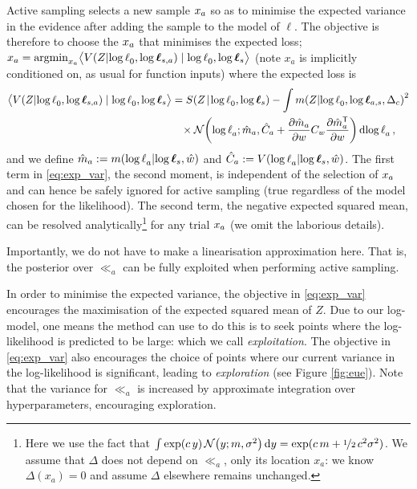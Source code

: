 \documentclass{article} %
\begin{document}
Active sampling selects a new sample $\lfv_a$ so as to minimise the expected variance in the evidence after adding the sample to the model of $\ell$.  The objective is therefore to choose the $\lfv_a$ that minimises the expected loss;
$\lfv_a = \argmin_{\lfv_a} \bigl\langle \cov{\If}{\ll_0,\tvr_{s,a}}\mid \ll_0,\tvr_{s}\bigr\rangle 
$
(note $x_a$ is implicitly conditioned on, as usual for function inputs) where the expected loss is
\begin{align}
\bigl\langle \cov{\If}{\ll_0,\tvr_{s,a}}\mid \ll_0,\tvr_{s}\bigr\rangle 
 & = \secm{\If}{\ll_0,\tvr_s} 
 - \int\mean{\If}{\ll_0,\tvr_{a,s},\Delta_c}^2\nonumber\\
& \hspace{0.3cm}
\times\N{\ll_a}
{\hat{m}_a }
{\hat{C}_a +\pderiv{\hat{m}_a}{w}C_w\pderiv{\hat{m}\tra_a}{w}}
\ud\ll_a\,,\label{eq:exp_var}
\end{align}
and we define
$\hat{m}_a \deq \mean{\ll_a}{\tvr_s,\hat{w}}$
and
$\hat{C}_a \deq \cov{\ll_a}{\tvr_s,\hat{w}}$.
The first term in \eqref{eq:exp_var}, the second moment, is independent of the selection of $\lfv_a$ and can hence  be safely ignored for active sampling (true regardless of the model chosen for the likelihood). 
The second term, the negative expected squared mean, can be resolved analytically\footnote{Here we use the fact that $\int \exp(c\, y)\, \N{y}{m}{\sigma^2} \ud y = \exp(c\, m + \nicefrac{1}{2}\, c^2 \sigma^2)$.  We assume that $\Delta$ does not depend on $\ll_a$, only its location $x_a$: we know $\Delta(x_a) = 0$ and assume $\Delta$ elsewhere remains unchanged.}
 for any trial $\lfv_a$ (we omit the laborious details). 

Importantly, we do not have to make a linearisation approximation here. That is, the \gpb  posterior over $\ll_a$ can be fully exploited when performing active sampling.
%

In order to minimise the expected variance, the objective in \eqref{eq:exp_var} encourages the maximisation of the expected squared mean of $Z$. Due to our log-\gpb model, one means the method can use to do this is to seek points where the log-likelihood is predicted to be large: which we call \emph{exploitation}.  The objective in \eqref{eq:exp_var} also encourages the choice of points where our current variance in the log-likelihood is significant, leading to \emph{exploration} (see Figure \ref{fig:eue}). Note that the variance for $\ll_a$ is increased by approximate integration over hyperparameters, encouraging exploration.
\end{document}

